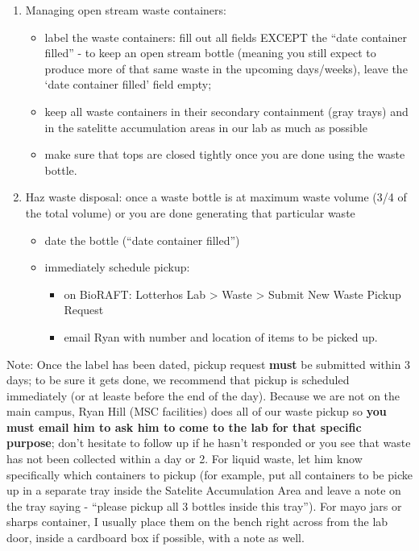 \documentclass[
  letterpaper,
  DIV=11,
  numbers=noendperiod]{scrreprt}
\begin{document}
\begin{enumerate}
\def\labelenumi{\arabic{enumi}.}
\item
  Managing open stream waste containers:

  \begin{itemize}
  \item
    label the waste containers: fill out all fields EXCEPT the ``date
    container filled'' - to keep an open stream bottle (meaning you
    still expect to produce more of that same waste in the upcoming
    days/weeks), leave the `date container filled' field empty;
  \item
    keep all waste containers in their secondary containment (gray
    trays) and in the satelitte accumulation areas in our lab as much as
    possible
  \item
    make sure that tops are closed tightly once you are done using the
    waste bottle.
  \end{itemize}
\item
  Haz waste disposal: once a waste bottle is at maximum waste volume
  (3/4 of the total volume) or you are done generating that particular
  waste

  \begin{itemize}
  \item
    date the bottle (``date container filled'')
  \item
    immediately schedule pickup:

    \begin{itemize}
    \item
      on BioRAFT: Lotterhos Lab \textgreater{} Waste \textgreater{}
      Submit New Waste Pickup Request
    \item
      email Ryan with number and location of items to be picked up.
    \end{itemize}
  \end{itemize}
\end{enumerate}

Note: Once the label has been dated, pickup request \textbf{must} be
submitted within 3 days; to be sure it gets done, we recommend that
pickup is scheduled immediately (or at leaste before the end of the
day). Because we are not on the main campus, Ryan Hill (MSC facilities)
does all of our waste pickup so \textbf{you must email him to ask him to
come to the lab for that specific purpose}; don't hesitate to follow up
if he hasn't responded or you see that waste has not been collected
within a day or 2. For liquid waste, let him know specifically which
containers to pickup (for example, put all containers to be picke up in
a separate tray inside the Satelite Accumulation Area and leave a note
on the tray saying - ``please pickup all 3 bottles inside this tray'').
For mayo jars or sharps container, I usually place them on the bench
right across from the lab door, inside a cardboard box if possible, with
a note as well.
\end{document}
